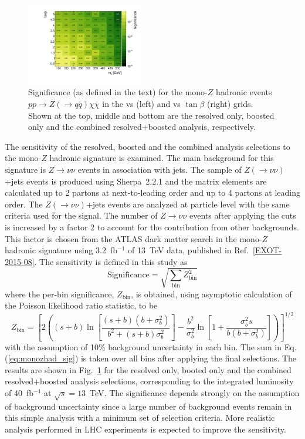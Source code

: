 \begin{figure}
\includegraphics[width=0.45\textwidth]{texinputs/04_grid/figures/monoz/hadronic/grid_tanb_ma_sum_bin100_sign_type3_bkg_uncert_0p10.pdf}
\caption{Significance (as defined in the text) for the mono-$Z$ hadronic events 
$pp \rightarrow Z(\to q\bar{q})\chi\overline{\chi}$ in the \ma vs \mA (left) and \ma vs $\tan\beta$ (right) grids. 
Shown at the top, middle and bottom are the resolved only, boosted only and the combined resolved+boosted 
analysis, respectively.}
\label{fig:monozhad_significance_grid}
\end{figure}

The sensitivity of the resolved, boosted and the combined analysis selections to the mono-$Z$ hadronic signature 
is examined. The main background for this signature is $Z \to \nu\nu$ events in association with jets. 
The sample of $Z (\to \nu\nu)$+jets events is produced using Sherpa~2.2.1 and the matrix elements are calculated
up to 2 partons at next-to-leading order and up to 4 partons at leading order. The $Z (\to \nu\nu)$+jets events
are analyzed at particle level with the same criteria used for the signal. The number of $Z \to \nu\nu$ events 
after applying the cuts is increased by a factor 2 to account for the contribution from other backgrounds. 
This factor is chosen from the 
ATLAS dark matter search in the mono-$Z$ hadronic signature using 3.2~fb$^{-1}$ of 13~TeV data,
published in Ref.~\ref{EXOT-2015-08}. The sensitivity is defined in this study as 
%
\begin{equation}
\text{Significance} = \sqrt{\sum_{\text{bin}} Z_{\text{bin}}^2}
\label{eq:monozhad_sig}
\end{equation}
%
where the per-bin significance, $Z_{\text{bin}}$, is obtained, using asymptotic calculation of the 
Poisson likelihood ratio statistic, to be 
%
\begin{equation}
Z_{\text{bin}} = \left[ 2\left( (s+b)\ln \left[ \frac{(s+b)(b+\sigma_b^2)}{b^2+(s+b)\sigma_b^2} \right] - \frac{b^2}{\sigma_b^2} \ln \left[ 1+\frac{\sigma_b^2 s}{b(b+\sigma_b^2)} \right] \right) \right]^{1/2} 
\end{equation}
%
with the assumption of 10\% background uncertainty in each \MET bin. 
The sum in Eq.(\ref{eq:monozhad_sig}) is taken over all \MET bins after applying the final selections.
The results are shown in Fig.~\ref{fig:monozhad_significance_grid} for the resolved only, booted only and 
the combined resolved+boosted analysis selections, corresponding to the integrated luminosity of 40~fb$^{-1}$
at $\sqrt{s} = 13$~TeV. The significance depends strongly on the assumption of background uncertainty 
since a large number of background events remain in this simple analysis with a minimum set of selection criteria.
More realistic analysis performed in LHC experiments is expected to improve the sensitivity.

